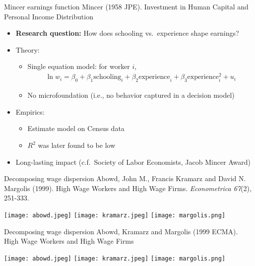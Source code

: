 \documentclass[aspectratio=169,compress,t,xcolor=table]{beamer}
\begin{document}
\begin{frame}{Mincer earnings function}
Mincer (1958 JPE). Investment in Human Capital and Personal Income Distribution
  \begin{itemize}
    \vfill\item {\color{MyStructure}\textbf{Research question:}} How does schooling vs.\ experience shape earnings?
    \vfill\item Theory:
    \begin{itemize}
      \item Single equation model: for worker \(i\),
      \begin{align*}
         \ln w_{i} = \beta_0 + \beta_1 \text{schooling}_i + \beta_2 \text{experience}_i + \beta_3 \text{experience}_i^2 + u_i
      \end{align*}
      \item No microfoundation (i.e., no behavior captured in a decision model)
    \end{itemize}
    \vfill\item Empirics:
    \begin{itemize}
      \item Estimate model on Census data
      \item \(R^2\) was later found to be low
    \end{itemize}
    \vfill\item Long-lasting impact (c.f.\ Society of Labor Economists, Jacob Mincer Award)
  \end{itemize}
\end{frame}

\begin{frame}{Decomposing wage dispersion}
Abowd, John M., Francis Kramarz and David N. Margolis (1999). High Wage Workers and High Wage Firms. \textit{Econometrica 67}(2), 251-333.
  \begin{center}
    \texttt{[image: abowd.jpeg]} \hspace*{1em}
    \texttt{[image: kramarz.jpeg]} \hspace*{1em}
    \texttt{[image: margolis.png]}
  \end{center}
\end{frame}
\addtocounter{framenumber}{-1}

\begin{frame}{Decomposing wage dispersion}
Abowd, Kramarz and Margolis (1999 ECMA). High Wage Workers and High Wage Firms \\ \phantom{you}
  \begin{center}
    \texttt{[image: abowd.jpeg]} \hspace*{1em}
    \texttt{[image: kramarz.jpeg]} \hspace*{1em}
    \texttt{[image: margolis.png]}
  \end{center}
\end{frame}
\addtocounter{framenumber}{-1}
\end{document}

